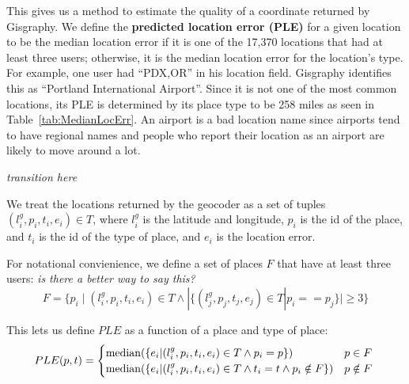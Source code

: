 This gives us a method to estimate the quality of a coordinate returned by
Gisgraphy.
%
We define the \textbf{predicted location error (PLE)} for a given location to
be the median location error if it is one of the 17,370 locations that had
at least three users; otherwise, it is the median location error for the location's
type.
%
For example, one user had ``PDX,OR'' in his location field.
%
Gisgraphy identifies this as ``Portland International Airport''.
%
Since it is not one of the most common locations, its PLE is determined by its
place type to be 258 miles as seen in Table~\ref{tab:MedianLocErr}.
%
An airport is a bad location name since airports tend to have regional names
and people who report their location as an airport are likely to move around a
lot.

\emph{transition here}

\newcommand{\geotuple}{{(l^g_i,p_i,t_i,e_i) \in T}}

We treat the locations returned by the geocoder as a set of tuples $\geotuple$,
where $l^g_i$ is the latitude and longitude, $p_i$ is the id of the place, and
$t_i$ is the id of the type of place, and $e_i$ is the location error.

For notational convienience, we define a set of places $F$ that have at least
three users:
\emph{is there a better way to say this?}
\[
    F = \{ p_i \mid \geotuple \land |\{(l^g_j,p_j,t_j,e_j) \in T|p_i==p_j\}| \geq 3 \}
\]

This lets us define $PLE$ as a function of a place and type of place:
\[
    PLE(p,t) =
    \begin{cases}
        \median(\{e_i |\geotuple \land p_i=p\})  & p \in F \\
        \median(\{e_i |\geotuple \land t_i=t \land p_i \notin F\})  & p \notin F \\
    \end{cases}
\
\]


